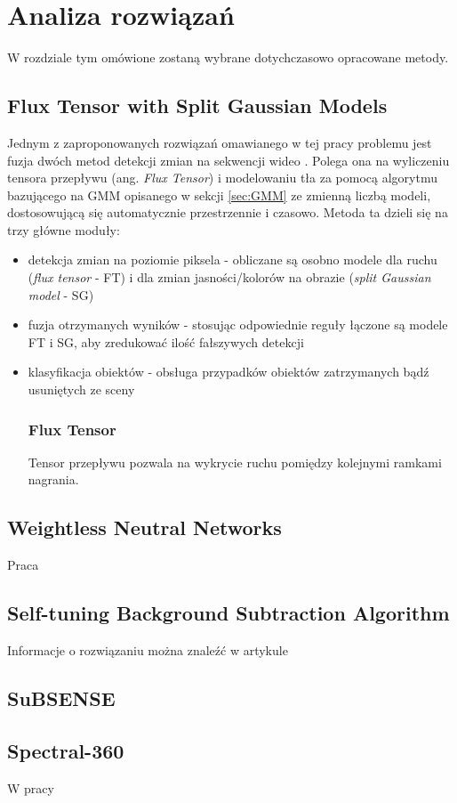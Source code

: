 \chapter{Analiza rozwiązań}
\label{cha:analiza}

W rozdziale tym omówione zostaną wybrane dotychczasowo opracowane metody.


\section{Flux Tensor with Split Gaussian Models}
\label{sec:FTSG}

Jednym z zaproponowanych rozwiązań omawianego w tej pracy problemu jest fuzja dwóch metod detekcji zmian na sekwencji wideo \cite{6910016}. Polega ona na wyliczeniu tensora przepływu (ang. \textit{Flux Tensor}) i modelowaniu tła za pomocą algorytmu bazującego na GMM opisanego w sekcji \ref{sec:GMM} ze zmienną liczbą modeli, dostosowującą się automatycznie przestrzennie i czasowo.
Metoda ta dzieli się na trzy główne moduły:
\begin{itemize}
\item
detekcja zmian na poziomie piksela - obliczane są osobno modele dla ruchu (\textit{flux tensor} - FT) i dla zmian jasności/kolorów na obrazie (\textit{split Gaussian model} - SG)
\item
fuzja otrzymanych wyników - stosując odpowiednie reguły łączone są modele FT i SG, aby zredukować ilość fałszywych detekcji
\item
klasyfikacja obiektów - obsługa przypadków obiektów zatrzymanych bądź usuniętych ze sceny
\subsection{Flux Tensor}
Tensor przepływu pozwala na wykrycie ruchu pomiędzy kolejnymi ramkami nagrania. 
\end{itemize}
\section{Weightless Neutral Networks}
Praca \cite{6910014}
\section{Self-tuning Background Subtraction Algorithm}
Informacje o rozwiązaniu można znaleźć w artykule \cite{6910012}
\section{SuBSENSE}
\cite{stflexible}
\section{Spectral-360}
W pracy \cite{6910013}


